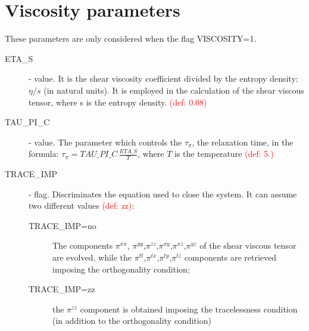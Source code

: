 \section{Viscosity parameters}
These parameters are only considered when the flag VISCOSITY=1.
\begin{description}
\item[ETA\_S] \real - value. It is the shear viscosity coefficient divided by the entropy density: $\eta/s$  (in natural units). It is employed in the calculation of the shear viscous tensor, where s is the entropy density. \textcolor{red}{(def: 0.08)}
\item[TAU\_PI\_C] \real - value. The parameter which controls the $\tau_{\pi}$, the relaxation time, in the formula: $\tau_{\pi}=TAU\_PI\_C\, \frac{ETA\_S}{T}$, where $T$ is the temperature \textcolor{red}{(def: 5.)}
\item[TRACE\_IMP] \chara - flag. Discriminates the equation used to close the system. It can assume two different values \textcolor{red}{(def: zz)}: 
\begin{description}
 \item[TRACE\_IMP=no] The components $\pi^{xx}$, $\pi^{yy}$,$\pi^{zz}$,$\pi^{xy}$,$\pi^{xz}$,$\pi^{yz}$ of the shear viscous tensor are evolved, while the $\pi^{tt}$,$\pi^{tx}$,$\pi^{ty}$,$\pi^{tz}$ components are retrieved imposing the orthogonality condition;
 \item[TRACE\_IMP=zz] the $\pi^{zz}$ component is obtained imposing the tracelessness condition (in addition to the orthogonality condition)
\end{description}
\end{description}
  
  
